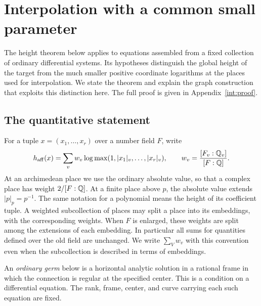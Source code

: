 \section{Interpolation with a common small parameter}
\label{int:section}

The height theorem below applies to equations assembled from a fixed
collection of ordinary differential systems.  Its hypotheses distinguish
the global height of the target from the much smaller positive coordinate
logarithms at the places used for interpolation.  We state the theorem
and explain the graph construction that exploits this distinction here.
The full proof is given in Appendix~\ref{int:proof}.

\subsection{The quantitative statement}

For a tuple $x=(x_1,\ldots,x_r)$ over a number field $F$, write
\[
 h_{\mathrm{aff}}(x)
   =\sum_v w_v\log\max(1,|x_1|_v,\ldots,|x_r|_v),
 \qquad w_v=\frac{[F_v:\mathbb Q_v]}{[F:\mathbb Q]}.
\]
At an archimedean place we use the ordinary absolute value, so that a complex
place has weight $2/[F:\mathbb Q]$. At a finite place above $p$, the absolute
value extends $|p|_p=p^{-1}$. The same notation for a polynomial means the
height of its coefficient tuple.  A weighted subcollection of places may
split a place into its embeddings, with the corresponding weights.  When
$F$ is enlarged, these weights are split among the extensions of each
embedding.  In particular all sums for quantities defined over the old
field are unchanged.  We write $\sum_V w_v$ with this convention even when
the subcollection is described in terms of embeddings.

An \emph{ordinary germ} below is a horizontal analytic solution in a rational
frame in which the connection is regular at the specified center.  This is
a condition on a differential equation.  The rank, frame, center, and curve
carrying each such equation are fixed.


